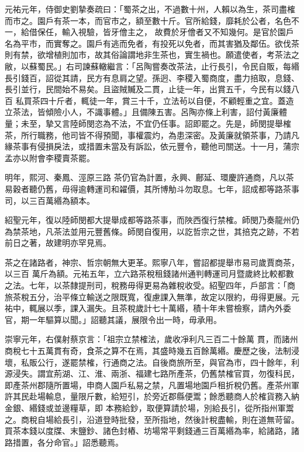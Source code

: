 \begin{pinyinscope}
 元祐元年，侍御史劉摯奏疏曰：「蜀茶之出，不過數十州，人賴以為生，茶司盡榷而市之。園戶有茶一本，而官市之，額至數十斤。官所給錢，靡耗於公者，名色不一，給借保任，輸入視驗，皆牙儈主之，
 故費於牙儈者又不知幾何。是官於園戶名為平市，而實奪之。園戶有逃而免者，有投死以免者，而其害猶及鄰伍。欲伐茶則有禁，欲增植則加市，故其俗論謂地非生茶也，實生禍也。願遣使者，考茶法之敝，以蘇蜀民。」右司諫蘇轍繼言：「呂陶嘗奏改茶法，止行長引，令民自販，每緡長引錢百，詔從其請，民方有息肩之望。孫迥、李稷入蜀商度，盡力掊取，息錢、長引並行，民間始不易矣。且盜賊贓及二貫，止徒一年，出賞五千，今民有以錢八百
 私買茶四十斤者，輒徒一年，賞三十千，立法茍以自便，不顧輕重之宜。蓋造立茶法，皆傾險小人，不識事體。」且備陳五害。呂陶亦條上利害，詔付黃廉體量；未至，摯又言陸師閔恣為不法，不宜仍任事。詔即罷之。先是，師閔提舉榷茶，所行職務，他司皆不得預聞，事權震灼，為患深密。及黃廉就領茶事，乃請凡緣茶事有侵損戾法，或措置未當及有訴訟，依元豐令，聽他司關送。十一月，蒲宗孟亦以附會李稷賣茶罷。



 明年，熙河、秦鳳、涇原三路
 茶仍官為計置，永興、鄜延、環慶許通商，凡以茶易穀者聽仍舊，毋得逾轉運司和糴價，其所博觔斗勿取息。七年，詔成都等路茶事司，以三百萬緡為額本。



 紹聖元年，復以陸師閔都大提舉成都等路茶事，而陜西復行禁榷。師閔乃奏龍州仍為禁茶地，凡茶法並用元豐舊條。師閔自復用，以訖哲宗之世，其掊克之跡，不若前日之著，故建明亦罕見焉。



 茶之在諸路者，神宗、哲宗朝無大更革。熙寧八年，嘗詔都提舉市易司歲賈商茶，以三百
 萬斤為額。元祐五年，立六路茶稅租錢諸州通判轉運司月暨歲終比較都數之法。七年，以茶隸提刑司，稅務毋得更易為雜稅收受。紹聖四年，戶部言：「商旅茶稅五分，治平條立輸送之限既寬，復慮課入無準，故定以限約，毋得更展。元祐中，輒展以季，課入漏失。且茶稅歲計七十萬緡，積十年未嘗檢察，請內外委官，期一年驅算以聞。」詔聽其議，展限令出一時，毋承用。



 崇寧元年，右僕射蔡京言：「祖宗立禁榷法，歲收凈利凡三百二十餘萬
 貫，而諸州商稅七十五萬貫有奇，食茶之算不在焉，其盛時幾五百餘萬緡。慶歷之後，法制浸壞，私販公行，遂罷禁榷，行通商之法。自後商旅所至，與官為市，四十餘年，利源浸失。謂宜荊湖、江、淮、兩浙、福建七路所產茶，仍舊禁榷官買，勿復科民，即產茶州郡隨所置場，申商人園戶私易之禁，凡置場地園戶租折稅仍舊。產茶州軍許其民赴場輸息，量限斤數，給短引，於旁近郡縣便鬻；餘悉聽商人於榷貨務入納金銀、緡錢或並邊糧草，即
 本務給鈔，取便算請於場，別給長引，從所指州軍鬻之。商稅自場給長引，沿道登時批發，至所指地，然後計稅盡輸，則在道無苛留。買茶本錢以度牒、末鹽鈔、諸色封樁、坊場常平剩錢通三百萬緡為率，給諸路，諸路措置，各分命官。」詔悉聽焉。




\end{pinyinscope}
